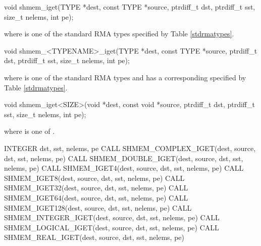 
\begin{apidefinition}

\begin{C11synopsis}
void shmem_iget(TYPE *dest, const TYPE *source, ptrdiff_t dst, ptrdiff_t sst, size_t nelems, int pe);
\end{C11synopsis}
where \TYPE{} is one of the standard \ac{RMA} types specified by Table \ref{stdrmatypes}.

\begin{Csynopsis}
void shmem_<TYPENAME>_iget(TYPE *dest, const TYPE *source, ptrdiff_t dst, ptrdiff_t sst, size_t nelems, int pe);
\end{Csynopsis}
where \TYPE{} is one of the standard \ac{RMA} types and has a corresponding \TYPENAME{} specified by Table \ref{stdrmatypes}.

\begin{CsynopsisCol}
void shmem_iget<SIZE>(void *dest, const void *source, ptrdiff_t dst, ptrdiff_t sst, size_t  nelems, int pe);
\end{CsynopsisCol}
where \SIZE{} is one of .

\begin{Fsynopsis}
INTEGER dst, sst, nelems, pe
CALL SHMEM_COMPLEX_IGET(dest, source, dst, sst, nelems, pe)
CALL SHMEM_DOUBLE_IGET(dest, source, dst, sst, nelems, pe)
CALL SHMEM_IGET4(dest, source, dst, sst, nelems, pe)
CALL SHMEM_IGET8(dest, source, dst, sst, nelems, pe)
CALL SHMEM_IGET32(dest, source, dst, sst, nelems, pe)
CALL SHMEM_IGET64(dest, source, dst, sst, nelems, pe)
CALL SHMEM_IGET128(dest, source, dst, sst, nelems, pe)
CALL SHMEM_INTEGER_IGET(dest, source, dst, sst, nelems, pe)
CALL SHMEM_LOGICAL_IGET(dest, source, dst, sst, nelems, pe)
CALL SHMEM_REAL_IGET(dest, source, dst, sst, nelems, pe)
\end{Fsynopsis}


\end{apidefinition}
